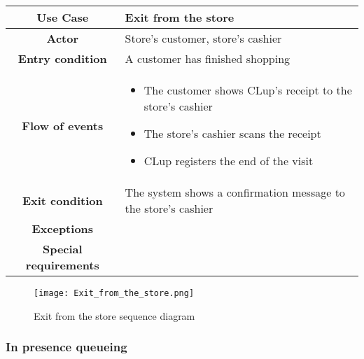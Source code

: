 \documentclass[../../main.tex]{subfiles}
\begin{document}
      \begin{table}[H]
        \centering
          \begin{tabular}{c m{}}
          \hline
          \textbf{Use Case} & Exit from the store\\ \hline
          \textbf{Actor} & Store's customer, store's cashier\\ \hline
          \textbf{Entry condition} & A customer has finished shopping\\  \hline
          \textbf{Flow of events} & \begin{itemize}
                                      \item The customer shows CLup's receipt to the store's cashier
                                      \item The store's cashier scans the receipt
                                      \item CLup registers the end of the visit
                                    \end{itemize}\\ \hline
          \textbf{Exit condition} & The system shows a confirmation message to the store's cashier \\ \hline
          \textbf{Exceptions} & \\ \hline
          \textbf{Special requirements} &\\ \hline
          \end{tabular}
      \end{table}

      \begin{figure}[H]
        \centering
        \texttt{[image: Exit\_from\_the\_store.png]}
        \caption{Exit from the store sequence diagram}
      \end{figure}


      \subsubsection{In presence queueing}
\end{document}

